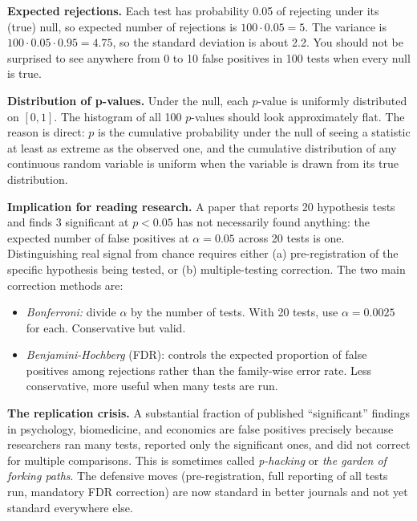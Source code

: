 \documentclass[
  letterpaper,
  11pt,
  twoside,
  openany]{scrbook}
\providecommand{\tightlist}{%
  \setlength{\itemsep}{0pt}\setlength{\parskip}{0pt}}
\begin{document}
\begin{tcolorbox}[enhanced jigsaw, arc=.35mm, bottomrule=.15mm, bottomtitle=1mm, breakable, colback=white, colbacktitle=quarto-callout-note-color!10!white, colframe=quarto-callout-note-color-frame, coltitle=black, left=2mm, leftrule=.75mm, opacityback=0, opacitybacktitle=0.6, rightrule=.15mm, title=\textcolor{quarto-callout-note-color}{\faInfo}\hspace{0.5em}{Solution to Problem 7}, titlerule=0mm, toprule=.15mm, toptitle=1mm]

\textbf{Expected rejections.} Each test has probability 0.05 of
rejecting under its (true) null, so expected number of rejections is
\(100 \cdot 0.05 = 5\). The variance is
\(100 \cdot 0.05 \cdot 0.95 = 4.75\), so the standard deviation is about
2.2. You should not be surprised to see anywhere from 0 to 10 false
positives in 100 tests when every null is true.

\textbf{Distribution of p-values.} Under the null, each \(p\)-value is
uniformly distributed on \([0, 1]\). The histogram of all 100
\(p\)-values should look approximately flat. The reason is direct: \(p\)
is the cumulative probability under the null of seeing a statistic at
least as extreme as the observed one, and the cumulative distribution of
any continuous random variable is uniform when the variable is drawn
from its true distribution.

\textbf{Implication for reading research.} A paper that reports 20
hypothesis tests and finds 3 significant at \(p < 0.05\) has not
necessarily found anything: the expected number of false positives at
\(\alpha = 0.05\) across 20 tests is one. Distinguishing real signal
from chance requires either (a) pre-registration of the specific
hypothesis being tested, or (b) multiple-testing correction. The two
main correction methods are:

\begin{itemize}
\tightlist
\item
  \emph{Bonferroni:} divide \(\alpha\) by the number of tests. With 20
  tests, use \(\alpha = 0.0025\) for each. Conservative but valid.
\item
  \emph{Benjamini-Hochberg} (FDR): controls the expected proportion of
  false positives among rejections rather than the family-wise error
  rate. Less conservative, more useful when many tests are run.
\end{itemize}

\textbf{The replication crisis.} A substantial fraction of published
``significant'' findings in psychology, biomedicine, and economics are
false positives precisely because researchers ran many tests, reported
only the significant ones, and did not correct for multiple comparisons.
This is sometimes called \emph{p-hacking} or \emph{the garden of forking
paths}. The defensive moves (pre-registration, full reporting of all
tests run, mandatory FDR correction) are now standard in better journals
and not yet standard everywhere else.

\end{tcolorbox}
\end{document}
